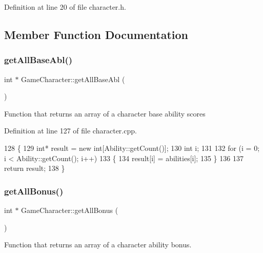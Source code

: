 Definition at line 20 of file character.\+h.



\subsection{Member Function Documentation}
\hypertarget{class_game_character_a9b1de762235904d9f11147780ffb45f1}{}\label{class_game_character_a9b1de762235904d9f11147780ffb45f1} 
\subsubsection{\texorpdfstring{get\+All\+Base\+Abl()}{getAllBaseAbl()}}
{\footnotesize\ttfamily int $\ast$ Game\+Character\+::get\+All\+Base\+Abl (\begin{DoxyParamCaption}{ }\end{DoxyParamCaption})}

Function that returns an array of a character base ability scores 

Definition at line 127 of file character.\+cpp.


\begin{DoxyCode}
128 \{
129     \textcolor{keywordtype}{int}* result = \textcolor{keyword}{new} \textcolor{keywordtype}{int}[Ability::getCount()];
130     \textcolor{keywordtype}{int} i;
131 
132     \textcolor{keywordflow}{for} (i = 0; i < Ability::getCount(); i++)
133     \{
134         result[i] = abilities[i];
135     \}
136 
137     \textcolor{keywordflow}{return} result;
138 \}
\end{DoxyCode}
\hypertarget{class_game_character_a369f58b909a9ac72e572cd5c65773779}{}\label{class_game_character_a369f58b909a9ac72e572cd5c65773779} 
\subsubsection{\texorpdfstring{get\+All\+Bonus()}{getAllBonus()}}
{\footnotesize\ttfamily int $\ast$ Game\+Character\+::get\+All\+Bonus (\begin{DoxyParamCaption}{ }\end{DoxyParamCaption})}

Function that returns an array of a character ability bonus. 

